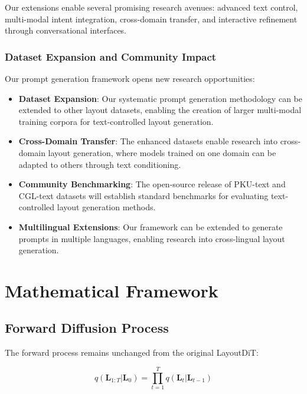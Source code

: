 \documentclass[journal,article,submit,pdftex,moreauthors]{Definitions/mdpi}
\begin{document}
Our extensions enable several promising research avenues: advanced text control, multi-modal intent integration, cross-domain transfer, and interactive refinement through conversational interfaces.

\subsubsection{Dataset Expansion and Community Impact}

Our prompt generation framework opens new research opportunities:

\begin{itemize}
\item \textbf{Dataset Expansion}: Our systematic prompt generation methodology can be extended to other layout datasets, enabling the creation of larger multi-modal training corpora for text-controlled layout generation.

\item \textbf{Cross-Domain Transfer}: The enhanced datasets enable research into cross-domain layout generation, where models trained on one domain can be adapted to others through text conditioning.

\item \textbf{Community Benchmarking}: The open-source release of PKU-text and CGL-text datasets will establish standard benchmarks for evaluating text-controlled layout generation methods.

\item \textbf{Multilingual Extensions}: Our framework can be extended to generate prompts in multiple languages, enabling research into cross-lingual layout generation.
\end{itemize}

\section{Mathematical Framework}

\subsection{Forward Diffusion Process}

The forward process remains unchanged from the original LayoutDiT:
\begin{linenomath}
\begin{equation}
q(\mathbf{L}_{1:T} | \mathbf{L}_0) = \prod_{t=1}^{T} q(\mathbf{L}_t | \mathbf{L}_{t-1})
\end{equation}
\end{linenomath}
\end{document}
